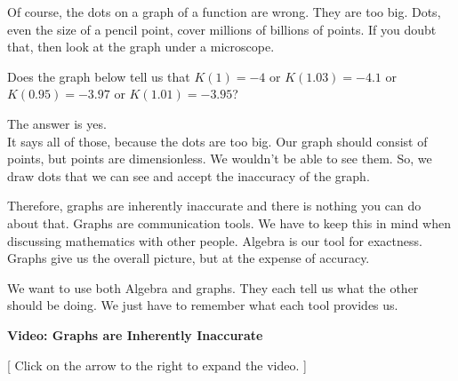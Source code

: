 \documentclass{ximera}
\begin{document}
Of course, the dots on a graph of a function are wrong. They are too big. Dots, even the size of a pencil point, cover millions of billions of points. If you doubt that, then look at the graph under a microscope.

Does the graph below tell us that $K(1) = -4$ or $K(1.03) = -4.1$ or $K(0.95) = -3.97$ or $K(1.01) = -3.95$?

\begin{image}
\end{image}

The answer is yes.  \\


It says all of those, because the dots are too big.  Our graph should consist of points, but points are dimensionless.  We wouldn't be able to see them.  So, we draw dots that we can see and accept the inaccuracy of the graph.

Therefore, graphs are inherently inaccurate and there is nothing you can do about that.  Graphs are communication tools. We have to keep this in mind when discussing mathematics with other people. Algebra is our tool for exactness.  Graphs give us the overall picture, but at the expense of accuracy.

We want to use both Algebra and graphs.  They each tell us what the other should be doing.  We just have to remember what each tool provides us.






\begin{explanation} \textbf{Video: Graphs are Inherently Inaccurate}

[ Click on the arrow to the right to expand the video. ]
\begin{expandable} 

\begin{center}
\end{center}

\end{expandable}
\end{explanation}
\end{document}

